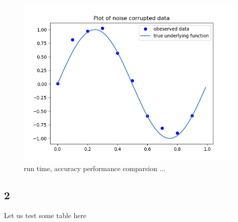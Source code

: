 \documentclass[letterpaper, 11pt]{article}
\begin{document}
\begin{figure}[!ht]
  \includegraphics[width=\linewidth]{fig/figure_3.png}
  \caption{run time, accuracy performance comparsion ...}
  \label{fig:cf_vs_gd}
\end{figure}


\subsection*{2}

Let us test some table here 
\end{document}
